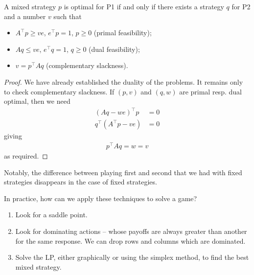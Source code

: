 \documentclass{../../template/note}
\begin{document}
    \begin{theorem}
        A mixed strategy $p$ is optimal for P1 if and only if there exists a strategy $q$ for P2 and a number $v$ such that
        \begin{itemize}
            \item $A^\intercal p \geq ve$, $e^\intercal p = 1$, $p \geq 0$ (primal feasibility);
            \item $Aq \leq ve$, $e^\intercal q = 1$, $q \geq 0$ (dual feasibility);
            \item $v = p^\intercal Aq$ (complementary slackness).
        \end{itemize}
    \end{theorem}
    
    \begin{proof}
        We have already established the duality of the problems. It remains only to check complementary slackness. If $(p, v)$ and $(q, w)$ are primal resp. dual optimal, then we need
        \begin{align*}
            (Aq-we)^\intercal p &= 0 \\
            q^\intercal (A^\intercal p - ve) &= 0
        \end{align*}
        giving
        \begin{align*}
            p^\intercal Aq = w = v
        \end{align*}
        as required.       
    \end{proof}
    
    Notably, the difference between playing first and second that we had with fixed strategies disappears in the case of fixed strategies.

    In practice, how can we apply these techniques to solve a game?
    \begin{enumerate}[label=\protect\circled{\arabic*}]
        \item Look for a saddle point.
        \item Look for dominating actions -- whose payoffs are always greater than another for the same response. We can drop rows and columns which are dominated.
        \item Solve the LP, either graphically or using the simplex method, to find the best mixed strategy.
    \end{enumerate}
    
\end{document}
